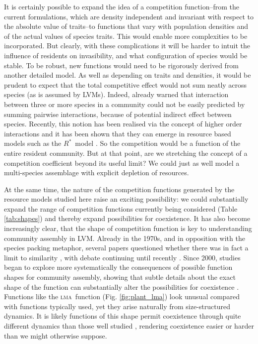 \documentclass[a4paper,11pt]{article}
\newcommand{\Rstar}{\ensuremath{R^*}}
\newcommand{\lma}{\textsc{lma}}
\begin{document}
It is certainly possible to expand the idea of a competition
function--from the current formulations, which are density independent
and invariant with respect to the absolute value of traits--to
functions that vary with population densities and of the actual values
of species traits. This would enable more complexities to be
incorporated. But clearly, with these complications it will be harder
to intuit the influence of residents on invasibility, and what
configuration of species would be stable. To be robust, new functions
would need to be rigorously derived from another detailed model. As
well as depending on traits and densities, it would be prudent to
expect that the total competitive effect would not sum neatly across
species (as is assumed by LVMs). Indeed, \citet{Levine-1976} already
warned that interaction between three or more species in a community
could not be easily predicted by summing pairwise interactions,
because of potential indirect effect between species. Recently, this
notion has been realised via the concept of higher order interactions
\citep{Levine-2017} and it has been shown that they can emerge in resource based models
such as the \Rstar\ model \citep{Letten-2019}. So the competition would be a function of the entire resident community.  But at that point, are we stretching the concept of a competition coefficient beyond its useful limit? We could just as well model a multi-species assemblage with explicit depletion of resources.

At the same time, the nature of the competition functions generated by
the resource models studied here raise an exciting possibility: we
could substantially expand the range of competition functions
currently being considered (Table \ref{tab:shapes}) and thereby expand
possibilities for coexistence. It has also become increasingly clear,
that the shape of competition function is key to understanding
community assembly in LVM. Already in the 1970s, and in opposition
with the species packing metaphor, several papers questioned whether
there was in fact a limit to similarity \citep{May-1972, Abrams-1975,
  Abrams-1983}, with debate continuing until recently
\citep{Meszena-2006, Barabas-2012, Leimar-2013}. Since 2000, studies
began to explore more systematically the consequences of possible
function shapes for community assembly, showing that subtle details
about the exact shape of the function can substantially alter the
possibilities for coexistence \citep{Calcagno-2006, Scheffer-2006,
  Pigolotti-2007,
  Barabas-2012,Barabas-2013,DAndrea-2013,Leimar-2013}. Functions like
the \lma\ function (Fig. \ref{fig:plant_lma}) look unusual compared
with functions typically used, yet they arise naturally from
size-structured dynamics. It is likely functions of this shape permit
coexistence through quite different dynamics than those well studied
\citep[e.g.][]{Leimar-2013}, rendering coexistence easier or harder
than we might otherwise suppose.
\end{document}
